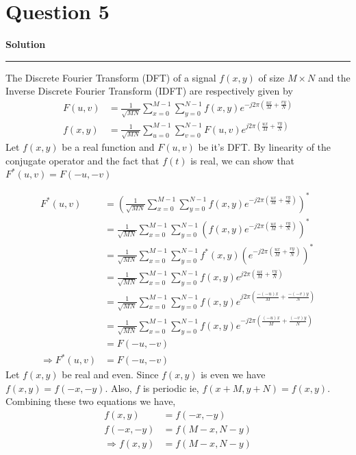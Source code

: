 \documentclass[a4paper]{article}
\title{\cooltitle{CS663 Assignment-3}}
\author{{\bf Saksham Rathi, Kavya Gupta, Shravan Srinivasa Raghavan} \\
\small Department of Computer Science, \\
Indian Institute of Technology Bombay \\}
\date{}
\newenvironment{solution}[2][]{%
    \begin{mdframed}[linecolor=green!60!black, linewidth=2pt, roundcorner=10pt, backgroundcolor=green!5!white, skipabove=12pt, skipbelow=12pt]%
        \textbf{\large #2} %
        \par\noindent\rule{\textwidth}{0.4pt} %
        \vspace{0.5em} %
}{%
    \end{mdframed}%
}
\begin{document}
\maketitle
\section*{Question 5}

\begin{solution}{Solution}
  The Discrete Fourier Transform (DFT) of a signal $f(x,y)$ of size $M \times N$ and the 
  Inverse Discrete Fourier Transform (IDFT) are respectively given by 
  \begin{align*}
    F(u,v) &= \frac{1}{\sqrt{MN}}\sum\limits_{x = 0}^{M - 1}\sum\limits_{y = 0}^{N - 1} f(x,y) e^{-j2\pi \left(\frac{ux}{M} + \frac{vy}{N}\right)}  \\  
    f(x,y) &= \frac{1}{\sqrt{MN}}\sum\limits_{u = 0}^{M - 1}\sum\limits_{v = 0}^{N - 1} F(u,v) e^{j2\pi \left(\frac{ux}{M} + \frac{vy}{N}\right)}
  \end{align*}
  Let $f(x,y)$ be a real function and $F(u,v)$ be it's DFT\@. By linearity of the conjugate operator and the fact that $f(t)$ 
  is real, we can show that $F^{*}(u,v) = F(-u,-v)$
  
  \begin{align*}
    F^{*}(u,v) &= {\left(\frac{1}{\sqrt{MN}}\sum\limits_{x = 0}^{M - 1}\sum\limits_{y = 0}^{N - 1} 
    f(x,y) e^{-j2\pi \left(\frac{ux}{M} + \frac{vy}{N}\right)}\right)}^{*} \\
    &= \frac{1}{\sqrt{MN}}\sum\limits_{x = 0}^{M - 1}\sum\limits_{y = 0}^{N - 1} 
    {\left(f(x,y) e^{-j2\pi \left(\frac{ux}{M} + \frac{vy}{N}\right)}\right)}^{*} \\
    &= \frac{1}{\sqrt{MN}}\sum\limits_{x = 0}^{M - 1}\sum\limits_{y = 0}^{N - 1} 
    f^{*}(x,y) {\left(e^{-j2\pi \left(\frac{ux}{M} + \frac{vy}{N}\right)}\right)}^{*} \\
    &= \frac{1}{\sqrt{MN}}\sum\limits_{x = 0}^{M - 1}\sum\limits_{y = 0}^{N - 1} 
    f(x,y) e^{j2\pi \left(\frac{ux}{M} + \frac{vy}{N}\right)} \\
    &= \frac{1}{\sqrt{MN}}\sum\limits_{x = 0}^{M - 1}\sum\limits_{y = 0}^{N - 1} 
    f(x,y) e^{j2\pi \left(\frac{-(-u)x}{M} + \frac{-(-v)y}{N}\right)} \\ 
    &= \frac{1}{\sqrt{MN}}\sum\limits_{x = 0}^{M - 1}\sum\limits_{y = 0}^{N - 1} 
    f(x,y) e^{-j2\pi \left(\frac{(-u)x}{M} + \frac{(-v)y}{N}\right)} \\
    &= F(-u,-v) \\
    \Rightarrow F^{*}(u,v) &= F(-u,-v)
  \end{align*}
  Let $f(x,y)$ be real and even. Since $f(x,y)$ is even we have $f(x,y) = f(-x,-y)$. Also, $f$ is periodic ie, $f(x + M,y + N) = f(x,y)$. Combining these 
  two equations we have,
  \begin{align}
    f(x,y) &= f(-x,-y) \nonumber \\
    f(-x,-y) &= f(M - x,N - y) \nonumber \\
    \Rightarrow \label{even}f(x,y) &= f(M - x,N - y)     
  \end{align}
  

\end{solution}
\end{document}
